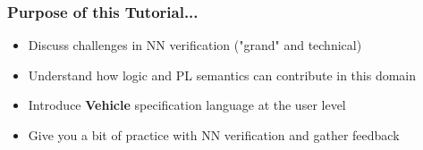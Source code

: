\documentclass[t,compress,aspectratio=169]{beamer}
\begin{document}
\begin{frame}
\frametitle{Purpose of this Tutorial...}

\begin{block}{}
\begin{itemize}

\item Discuss challenges in NN verification ("grand" and technical)

\item Understand how logic and PL semantics can contribute in this domain

\item Introduce \textbf{Vehicle} specification language at the user level

\item Give you a  bit of practice with NN verification and gather feedback
\end{itemize}
\end{block}

\end{frame}
\end{document}
